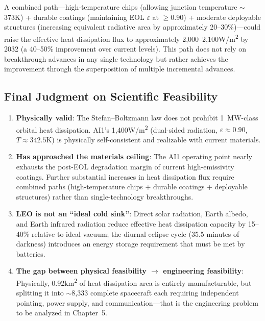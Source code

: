 A combined path---high-temperature chips (allowing junction temperature $\sim$373\;K) + durable coatings (maintaining EOL $\varepsilon$ at $\geq$0.90) + moderate deployable structures (increasing equivalent radiative area by approximately 20--30\%)---could raise the effective heat dissipation flux to approximately 2,000--2,100\;W/m\textsuperscript{2} by 2032 (a 40--50\% improvement over current levels). This path does not rely on breakthrough advances in any single technology but rather achieves the improvement through the superposition of multiple incremental advances.

\subsection{Final Judgment on Scientific Feasibility}

\begin{enumerate}[leftmargin=*]
    \item \textbf{Physically valid}: The Stefan--Boltzmann law does not prohibit 1~MW-class orbital heat dissipation. AI1's 1,400\;W/m\textsuperscript{2} (dual-sided radiation, $\varepsilon\approx0.90$, $T\approx342.5$\;K) is physically self-consistent and realizable with current materials.
    \item \textbf{Has approached the materials ceiling}: The AI1 operating point nearly exhausts the post-EOL degradation margin of current high-emissivity coatings. Further substantial increases in heat dissipation flux require combined paths (high-temperature chips + durable coatings + deployable structures) rather than single-technology breakthroughs.
    \item \textbf{LEO is not an ``ideal cold sink''}: Direct solar radiation, Earth albedo, and Earth infrared radiation reduce effective heat dissipation capacity by 15--40\% relative to ideal vacuum; the diurnal eclipse cycle (35.5 minutes of darkness) introduces an energy storage requirement that must be met by batteries.
    \item \textbf{The gap between physical feasibility $\rightarrow$ engineering feasibility}: Physically, 0.92\;km\textsuperscript{2} of heat dissipation area is entirely manufacturable, but splitting it into $\sim$8,333 complete spacecraft each requiring independent pointing, power supply, and communication---that is the engineering problem to be analyzed in Chapter~5.
\end{enumerate}

